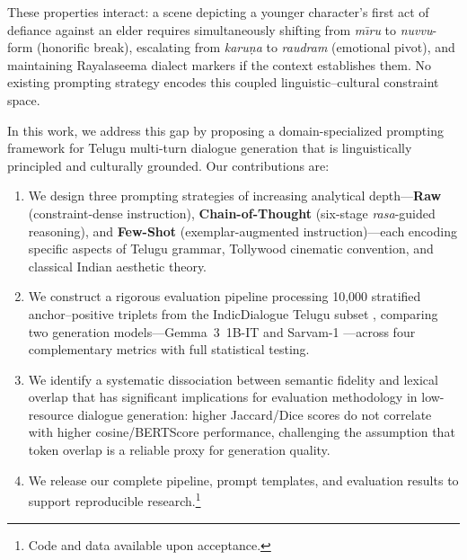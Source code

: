 \documentclass[11pt]{article}
\begin{document}
These properties interact: a scene depicting a younger character's first act of defiance against an elder requires simultaneously shifting from \textit{m\={\i}ru} to \textit{nuvvu}-form (honorific break), escalating from \textit{karu\d{n}a} to \textit{raudram} (emotional pivot), and maintaining Rayalaseema dialect markers if the context establishes them. No existing prompting strategy encodes this coupled linguistic--cultural constraint space.

In this work, we address this gap by proposing a domain-specialized prompting framework for Telugu multi-turn dialogue generation that is linguistically principled and culturally grounded. Our contributions are:

\begin{enumerate}[leftmargin=*,itemsep=2pt]
    \item We design three prompting strategies of increasing analytical depth---\textbf{Raw} (constraint-dense instruction), \textbf{Chain-of-Thought} (six-stage \textit{rasa}-guided reasoning), and \textbf{Few-Shot} (exemplar-augmented instruction)---each encoding specific aspects of Telugu grammar, Tollywood cinematic convention, and classical Indian aesthetic theory.
    
    \item We construct a rigorous evaluation pipeline processing 10,000 stratified anchor--positive triplets from the IndicDialogue Telugu subset \citep{bharadwaj-etal-2023-indicdialogue}, comparing two generation models---Gemma~3~1B-IT \citep{gemma-team-2024} and Sarvam-1 \citep{sarvam-ai-2024}---across four complementary metrics with full statistical testing.
    
    \item We identify a systematic dissociation between semantic fidelity and lexical overlap that has significant implications for evaluation methodology in low-resource dialogue generation: higher Jaccard/Dice scores do not correlate with higher cosine/BERTScore performance, challenging the assumption that token overlap is a reliable proxy for generation quality.
    
    \item We release our complete pipeline, prompt templates, and evaluation results to support reproducible research.\footnote{Code and data available upon acceptance.}
\end{enumerate}

\end{document}
